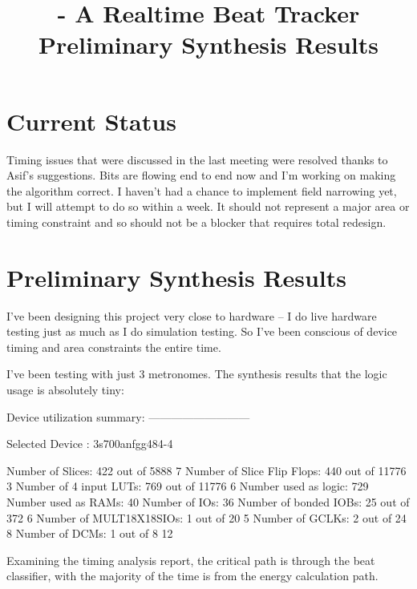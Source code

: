 \documentclass[letterpaper]{article}
\title{\projname{} - A Realtime Beat Tracker \\ Preliminary Synthesis Results}
\begin{document}
\maketitle

\section{Current Status}

    Timing issues that were discussed in the last meeting were resolved thanks
    to Asif's suggestions.  Bits are flowing end to end now and I'm working on
    making the algorithm correct.  I haven't had a chance to implement field
    narrowing yet, but I will attempt to do so within a week.  It should not
    represent a major area or timing constraint and so should not be a blocker
    that requires total redesign.

\section{Preliminary Synthesis Results}

    I've been designing this project very close to hardware -- I do live
    hardware testing just as much as I do simulation testing.  So I've been
    conscious of device timing and area constraints the entire time.

    I've been testing with just 3 metronomes. The synthesis results that the
    logic usage is absolutely tiny:

\begin{monospace}
Device utilization summary:
---------------------------

Selected Device : 3s700anfgg484-4 

 Number of Slices:           422  out of   5888     7%
 Number of Slice Flip Flops: 440  out of  11776     3%
 Number of 4 input LUTs:     769  out of  11776     6%
    Number used as logic:    729
    Number used as RAMs:      40
 Number of IOs:               36
 Number of bonded IOBs:       25  out of    372     6%
 Number of MULT18X18SIOs:      1  out of     20     5%
 Number of GCLKs:              2  out of     24     8%
 Number of DCMs:               1  out of      8    12%
\end{monospace}

Examining the timing analysis report, the critical path is through the beat
classifier, with the majority of the time is from the energy calculation path.
\end{document}
